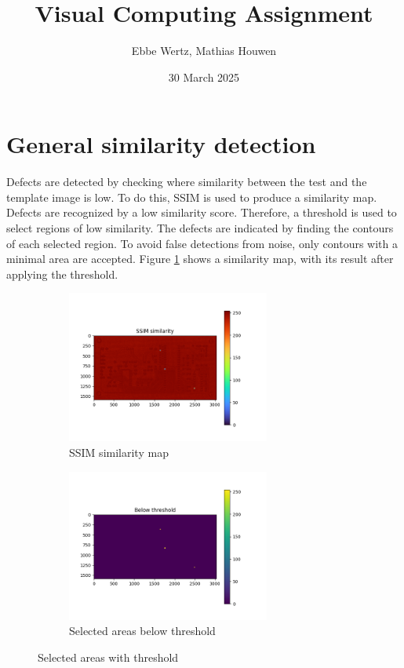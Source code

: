 \documentclass{report}
\title{Visual Computing Assignment}
\author{Ebbe Wertz, Mathias Houwen}
\date{30 March 2025}
\begin{document}
\maketitle

\section{General similarity detection}
\label{sec:ssim}

Defects are detected by checking where similarity between the test and the template image is low. To do this, SSIM is used to produce a similarity map. Defects are recognized by a low similarity score. Therefore, a threshold is used to select regions of low similarity. The defects are indicated by finding the contours of each selected region. To avoid false detections from noise, only contours with a minimal area are accepted. Figure \ref{fig:ssim} shows a similarity map, with its result after applying the threshold.

\begin{figure}[H]
    \centering
    \begin{subfigure}[b]{0.45\linewidth}
        \centering
        \includegraphics[height=50mm, keepaspectratio]{report_images/plots/ssim.png}
        \caption{SSIM similarity map}
    \end{subfigure}
    \hfill
    \begin{subfigure}[b]{0.45\linewidth}
        \centering
        \includegraphics[height=50mm, keepaspectratio]{report_images/plots/thresh.png}
        \caption{Selected areas below threshold}
    \end{subfigure}
    \caption{Selected areas with threshold}
    \label{fig:ssim}
\end{figure}
\end{document}

